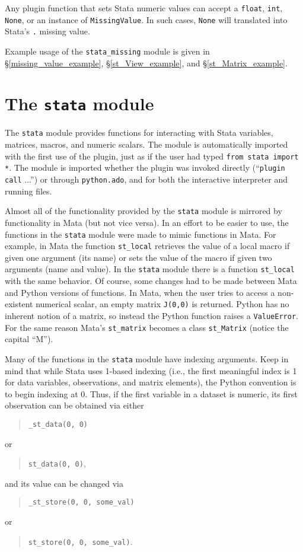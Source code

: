 \documentclass{article}
\begin{document}
	Any plugin function that sets Stata numeric values can accept a \lstinline{float}, \lstinline{int}, \lstinline$None$, or an instance of \lstinline{MissingValue}. In such cases, \lstinline$None$ will translated into Stata's \lstinline$.$ missing value.
	
	Example usage of the \lstinline{stata_missing} module is given in \S\ref{missing_value_example}, \S\ref{st_View_example}, and \S\ref{st_Matrix_example}.
  
	
\section{The \lstinline$stata$ module} \label{stata_module}
	
			The \lstinline$stata$ module provides functions for interacting with Stata variables, matrices, macros, and numeric scalars. The module is automatically imported with the first use of the plugin, just as if the user had typed \lstinline$from stata import *$. The module is imported whether the plugin was invoked directly (``\lstinline$plugin call$ ...'') or through \lstinline$python.ado$, and for both the interactive interpreter and running files. 
			
			Almost all of the functionality provided by the \lstinline$stata$ module is mirrored by functionality in Mata (but not vice versa). In an effort to be easier to use, the functions in the \lstinline$stata$ module were made to mimic functions in Mata. For example, in Mata the function \lstinline$st_local$ retrieves the value of a local macro if given one argument (its name) or sets the value of the macro if given two arguments (name and value). In the \lstinline$stata$ module there is a function \lstinline$st_local$ with the same behavior. Of course, some changes had to be made between Mata and Python versions of functions. In Mata, when the user tries to access a non-existent numerical scalar, an empty matrix \lstinline$J(0,0)$ is returned. Python has no inherent notion of a matrix, so instead the Python function raises a \lstinline{ValueError}. For the same reason Mata's \lstinline$st_matrix$ becomes a class \lstinline$st_Matrix$ (notice the capital ``M'').
			
			Many of the functions in the \lstinline$stata$ module have indexing arguments. Keep in mind that while Stata uses 1-based indexing (i.e., the first meaningful index is 1 for data variables, observations, and matrix elements), the Python convention is to begin indexing at 0. Thus, if the first variable in a dataset is numeric, its first observation can be obtained via either 
			\begin{quote}
				\lstinline$_st_data(0, 0)$
			\end{quote}
			or
			\begin{quote}
				\lstinline$st_data(0, 0)$,
			\end{quote}
			and its value can be changed via
			\begin{quote}
				\lstinline$_st_store(0, 0, some_val)$
			\end{quote}
			or
			\begin{quote}
				\lstinline$st_store(0, 0, some_val)$.
			\end{quote}
\end{document}
